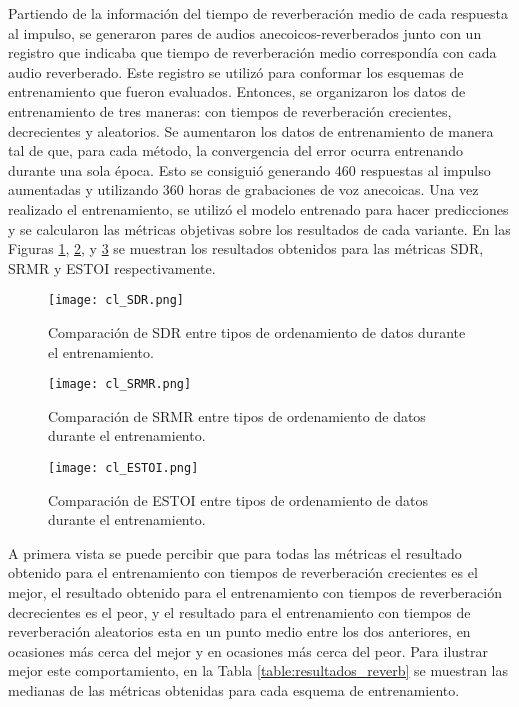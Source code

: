 Partiendo de la información del tiempo de reverberación medio de cada respuesta al impulso, se generaron pares de audios anecoicos-reverberados junto con un registro que indicaba que tiempo de reverberación medio correspondía con cada audio reverberado. Este registro se utilizó para conformar los esquemas de entrenamiento que fueron evaluados. Entonces, se organizaron los datos de entrenamiento de tres maneras: con tiempos de reverberación crecientes, decrecientes y aleatorios. 
Se aumentaron los datos de entrenamiento de manera tal de que, para cada método, la convergencia del error ocurra entrenando durante una sola época. Esto se consiguió generando 460 respuestas al  impulso aumentadas y utilizando 360 horas de grabaciones de voz anecoicas. Una vez realizado el entrenamiento, se utilizó el modelo entrenado para hacer predicciones y se calcularon las métricas objetivas sobre los resultados de cada variante. En las Figuras \ref{fig:cl_sdr}, \ref{fig:cl_srmr}, y \ref{fig:cl_estoi} se muestran los resultados obtenidos para las métricas SDR, SRMR y ESTOI respectivamente. 

\begin{figure}[H]
	\centering{}
	\texttt{[image: cl\_SDR.png]}
	\caption{Comparación de SDR entre tipos de ordenamiento de datos durante el entrenamiento.}
	\label{fig:cl_sdr}
\end{figure}

\begin{figure}[H]
	\centering{}
	\texttt{[image: cl\_SRMR.png]}
	\caption{Comparación de SRMR entre tipos de ordenamiento de datos durante el entrenamiento.}
	\label{fig:cl_srmr}
\end{figure}

\begin{figure}[H]
	\centering{}
	\texttt{[image: cl\_ESTOI.png]}
	\caption{Comparación de ESTOI entre tipos de ordenamiento de datos durante el entrenamiento.}
	\label{fig:cl_estoi}
\end{figure}

A primera vista se puede percibir que para todas las métricas el resultado obtenido para el entrenamiento con tiempos de reverberación crecientes es el mejor, el resultado obtenido para el entrenamiento con tiempos de reverberación decrecientes es el peor, y el resultado para el entrenamiento con tiempos de reverberación aleatorios esta en un punto medio entre los dos anteriores, en ocasiones más cerca del mejor y en ocasiones más cerca del peor. Para ilustrar mejor este comportamiento, en la Tabla \ref{table:resultados_reverb} se muestran las medianas de las métricas obtenidas para cada esquema de entrenamiento. 

